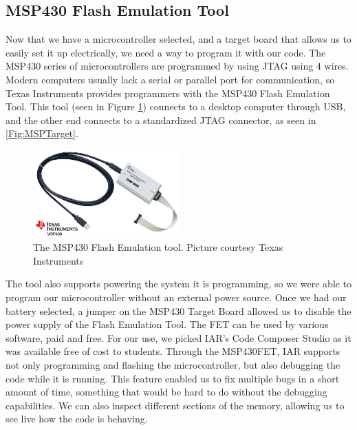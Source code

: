 \subsection{MSP430 Flash Emulation Tool}
\label{Sec:MSP430FET}
Now that we have a microcontroller selected, and a target board that allows us to easily set it up electrically, we need a way to program it with our code. The MSP430 series of microcontrollers are programmed by using JTAG using 4 wires. Modern computers usually lack a serial or parallel port for communication, so Texas Instruments provides programmers with the MSP430 Flash Emulation Tool. This tool (seen in Figure \ref{Fig:MSP430FET}) connects to a desktop computer through USB, and the other end connects to a standardized JTAG connector, as seen in \ref{Fig:MSPTarget}. 
\begin{figure}
\begin{center}
\includegraphics[width=0.5\textwidth]{images/MSP430FETUIF.jpg}
\caption{The MSP430 Flash Emulation tool. Picture courtesy Texas Instruments}
\label{Fig:MSP430FET}
\end{center}
\end{figure}

The tool also supports powering the system it is programming, so we were able to program our microcontroller without an external power source. Once we had our battery selected, a jumper on the MSP430 Target Board allowed us to disable the power supply of the Flash Emulation Tool. The FET can be used by various software, paid and free. For our use, we picked IAR's Code Composer Studio as it was available free of cost to students. Through the MSP430FET, IAR supports not only programming and flashing the microcontroller, but also debugging the code while it is running. This feature enabled us to fix multiple bugs in a short amount of time, something that would be hard to do without the debugging capabilities. We can also inspect different sections of the memory, allowing us to see live how the code is behaving.


